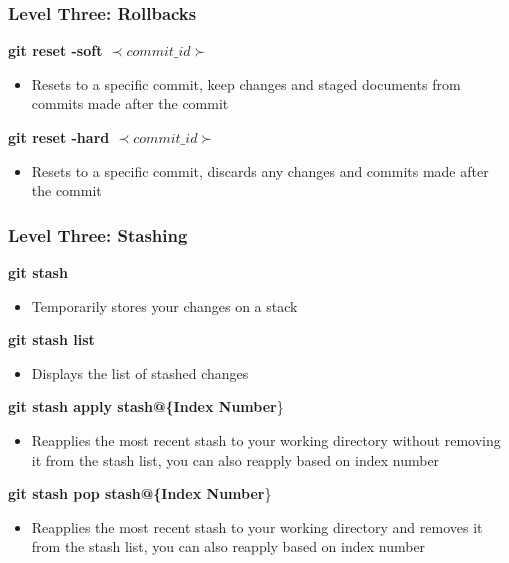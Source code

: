 \documentclass{beamer}
\begin{document}
\begin{frame}
	\frametitle{\textbf{Level Three: Rollbacks}}
	
	\textbf{git reset -soft \(\prec commit\_id \succ\)}
	\begin{itemize}
		\item Resets to a specific commit, keep changes and staged documents from commits made after the commit
	\end{itemize}
	\vspace{0.25cm}

	\textbf{git reset -hard \(\prec commit\_id \succ\)}
	\begin{itemize}
		\item Resets to a specific commit, discards any changes and commits made after the commit
	\end{itemize}

\end{frame}

\begin{frame}
	\frametitle{\textbf{Level Three: Stashing}}
	
	\textbf{git stash}	
	\begin{itemize}
	\item Temporarily stores your changes on a stack
	\end{itemize}
	\vspace{0.25cm}

	\textbf{git stash list}
	\begin{itemize}
	\item Displays the list of stashed changes 
	\end{itemize}
	\vspace{0.25cm}

	\textbf{git stash apply stash@\{Index Number}\}
	\begin{itemize}
	\item Reapplies the most recent stash to your working directory without
removing it from the stash list, you can also reapply based on index number
	\end{itemize}
	\vspace{0.25cm}

	\textbf{git stash pop stash@\{Index Number}\}
	\begin{itemize}
	\item Reapplies the most recent stash to your working directory and removes it
from the stash list, you can also reapply based on index number
	\end{itemize}

\end{frame}
\end{document}
